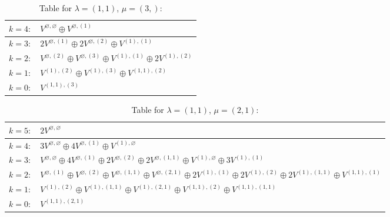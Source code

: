 \renewcommand{\arraystretch}{1.6} 
\begin{table}[H]
\centering
\caption{Table for $\lambda = (1, 1)$, $\mu = (3,)$:}
\begin{tabular}{|>{\centering\arraybackslash}p{15cm}|}
\hline
 $k = 4: \quad V^{\varnothing, \varnothing} \oplus V^{\varnothing, (1)} $ \\ \hline
 $k = 3: \quad 2 V^{\varnothing, (1)} \oplus 2 V^{\varnothing, (2)} \oplus V^{(1), (1)} $ \\ \hline
 $k = 2: \quad V^{\varnothing, (2)} \oplus V^{\varnothing, (3)} \oplus V^{(1), (1)} \oplus 2 V^{(1), (2)} $ \\ \hline
 $k = 1: \quad V^{(1), (2)} \oplus V^{(1), (3)} \oplus V^{(1, 1), (2)} $ \\ \hline
 $k = 0: \quad V^{(1, 1), (3)} $ \\ \hline
\end{tabular}
\end{table}

\renewcommand{\arraystretch}{1.6} 
\begin{table}[H]
\centering
\caption{Table for $\lambda = (1, 1)$, $\mu = (2, 1)$:}
\begin{tabular}{|>{\centering\arraybackslash}p{15cm}|}
\hline
 $k = 5: \quad 2 V^{\varnothing, \varnothing} $ \\ \hline
 $k = 4: \quad 3 V^{\varnothing, \varnothing} \oplus 4 V^{\varnothing, (1)} \oplus V^{(1), \varnothing} $ \\ \hline
 $k = 3: \quad V^{\varnothing, \varnothing} \oplus 4 V^{\varnothing, (1)} \oplus 2 V^{\varnothing, (2)} \oplus 2 V^{\varnothing, (1, 1)} \oplus V^{(1), \varnothing} \oplus 3 V^{(1), (1)} $ \\ \hline
 $k = 2: \quad V^{\varnothing, (1)} \oplus V^{\varnothing, (2)} \oplus V^{\varnothing, (1, 1)} \oplus V^{\varnothing, (2, 1)} \oplus 2 V^{(1), (1)} \oplus 2 V^{(1), (2)} \oplus 2 V^{(1), (1, 1)} \oplus V^{(1, 1), (1)} $ \\ \hline
 $k = 1: \quad V^{(1), (2)} \oplus V^{(1), (1, 1)} \oplus V^{(1), (2, 1)} \oplus V^{(1, 1), (2)} \oplus V^{(1, 1), (1, 1)} $ \\ \hline
 $k = 0: \quad V^{(1, 1), (2, 1)} $ \\ \hline
\end{tabular}
\end{table}

